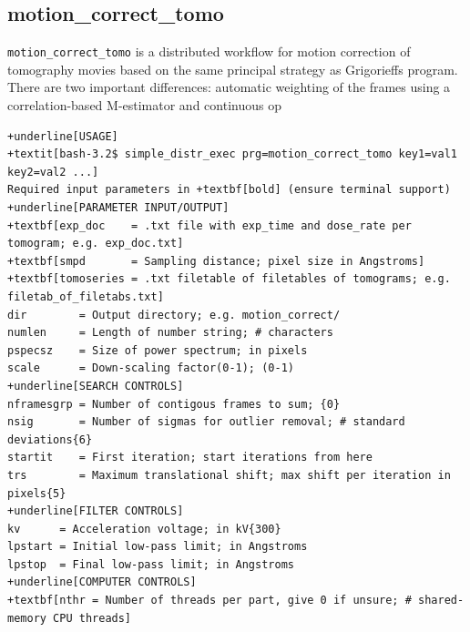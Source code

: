\documentclass[a4paper,11pt]{article}
\newcommand{\prgname}[1]{\textcolor{NavyBlue}{\texttt{#1}}}
\begin{document}
\subsection{motion\_correct\_tomo}
\label{motion_correct_tomo}
\prgname{motion\_correct\_tomo} is a distributed workflow for motion correction of tomography movies based on the same principal strategy as Grigorieffs program. There are two important differences: automatic weighting of the frames using a correlation-based M-estimator and continuous op
\begin{Verbatim}[commandchars=+\[\],fontsize=\small,breaklines=true]
+underline[USAGE]
+textit[bash-3.2$ simple_distr_exec prg=motion_correct_tomo key1=val1 key2=val2 ...]
Required input parameters in +textbf[bold] (ensure terminal support)
+underline[PARAMETER INPUT/OUTPUT]
+textbf[exp_doc    = .txt file with exp_time and dose_rate per tomogram; e.g. exp_doc.txt]
+textbf[smpd       = Sampling distance; pixel size in Angstroms]
+textbf[tomoseries = .txt filetable of filetables of tomograms; e.g. filetab_of_filetabs.txt]
dir        = Output directory; e.g. motion_correct/
numlen     = Length of number string; # characters
pspecsz    = Size of power spectrum; in pixels
scale      = Down-scaling factor(0-1); (0-1)
+underline[SEARCH CONTROLS]
nframesgrp = Number of contigous frames to sum; {0}
nsig       = Number of sigmas for outlier removal; # standard deviations{6}
startit    = First iteration; start iterations from here
trs        = Maximum translational shift; max shift per iteration in pixels{5}
+underline[FILTER CONTROLS]
kv      = Acceleration voltage; in kV{300}
lpstart = Initial low-pass limit; in Angstroms
lpstop  = Final low-pass limit; in Angstroms
+underline[COMPUTER CONTROLS]
+textbf[nthr = Number of threads per part, give 0 if unsure; # shared-memory CPU threads]
\end{Verbatim}
\end{document}
